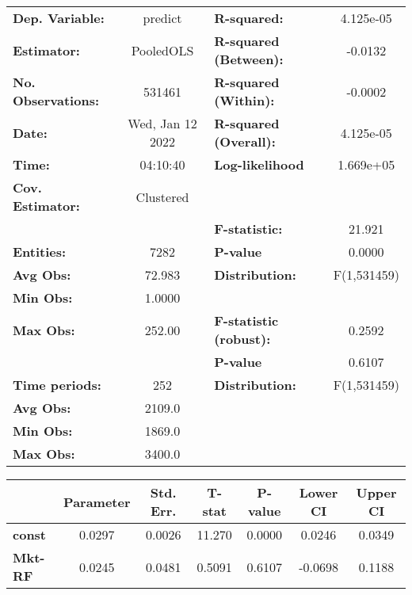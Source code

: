 \begin{center}
\begin{tabular}{lclc}
\toprule
\textbf{Dep. Variable:}    &      predict       & \textbf{  R-squared:         }   &    4.125e-05     \\
\textbf{Estimator:}        &     PooledOLS      & \textbf{  R-squared (Between):}  &     -0.0132      \\
\textbf{No. Observations:} &       531461       & \textbf{  R-squared (Within):}   &     -0.0002      \\
\textbf{Date:}             &  Wed, Jan 12 2022  & \textbf{  R-squared (Overall):}  &    4.125e-05     \\
\textbf{Time:}             &      04:10:40      & \textbf{  Log-likelihood     }   &    1.669e+05     \\
\textbf{Cov. Estimator:}   &     Clustered      & \textbf{                     }   &                  \\
\textbf{}                  &                    & \textbf{  F-statistic:       }   &      21.921      \\
\textbf{Entities:}         &        7282        & \textbf{  P-value            }   &      0.0000      \\
\textbf{Avg Obs:}          &       72.983       & \textbf{  Distribution:      }   &   F(1,531459)    \\
\textbf{Min Obs:}          &       1.0000       & \textbf{                     }   &                  \\
\textbf{Max Obs:}          &       252.00       & \textbf{  F-statistic (robust):} &      0.2592      \\
\textbf{}                  &                    & \textbf{  P-value            }   &      0.6107      \\
\textbf{Time periods:}     &        252         & \textbf{  Distribution:      }   &   F(1,531459)    \\
\textbf{Avg Obs:}          &       2109.0       & \textbf{                     }   &                  \\
\textbf{Min Obs:}          &       1869.0       & \textbf{                     }   &                  \\
\textbf{Max Obs:}          &       3400.0       & \textbf{                     }   &                  \\
\bottomrule
\end{tabular}
\begin{tabular}{lcccccc}
                & \textbf{Parameter} & \textbf{Std. Err.} & \textbf{T-stat} & \textbf{P-value} & \textbf{Lower CI} & \textbf{Upper CI}  \\
\midrule
\textbf{const}  &       0.0297       &       0.0026       &      11.270     &      0.0000      &       0.0246      &       0.0349       \\
\textbf{Mkt-RF} &       0.0245       &       0.0481       &      0.5091     &      0.6107      &      -0.0698      &       0.1188       \\
\bottomrule
\end{tabular}
\end{center}
